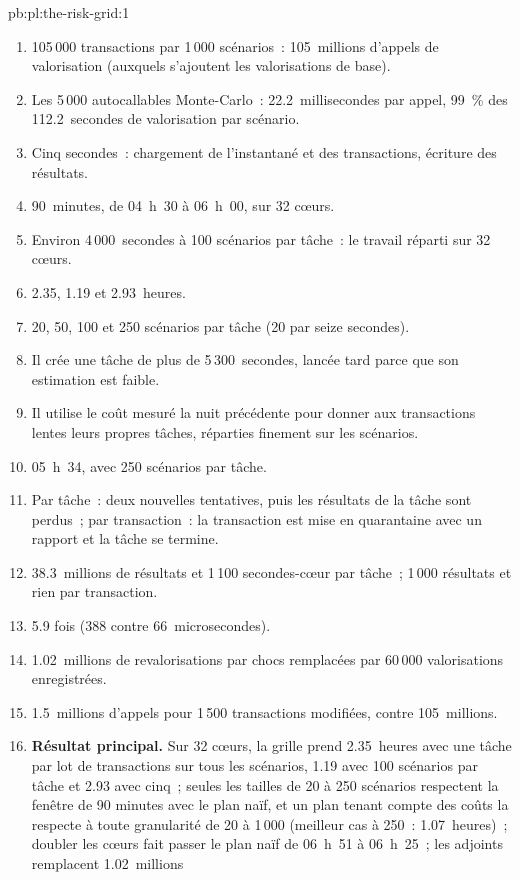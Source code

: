 \begin{solution}{pb:pl:the-risk-grid:1}
\begin{enumerate}
\item 105\,000 transactions par 1\,000 scénarios~: 105~millions d'appels de valorisation (auxquels s'ajoutent les valorisations de base).
\item Les 5\,000 autocallables Monte-Carlo~: 22.2~millisecondes par appel, 99~\% des 112.2~secondes de valorisation par scénario.
\item Cinq secondes~: chargement de l'instantané et des transactions, écriture des résultats.
\item 90~minutes, de 04~h~30 à 06~h~00, sur 32 cœurs.
\item Environ 4\,000~secondes à 100 scénarios par tâche~: le travail réparti sur 32 cœurs.
\item 2.35, 1.19 et 2.93~heures.
\item 20, 50, 100 et 250 scénarios par tâche (20 par seize secondes).
\item Il crée une tâche de plus de 5\,300~secondes, lancée tard parce que son estimation est faible.
\item Il utilise le coût mesuré la nuit précédente pour donner aux transactions lentes leurs propres tâches, réparties finement sur les scénarios.
\item 05~h~34, avec 250 scénarios par tâche.
\item Par tâche~: deux nouvelles tentatives, puis les résultats de la tâche sont perdus~; par transaction~: la transaction est mise en quarantaine avec un rapport et la tâche se termine.
\item 38.3~millions de résultats et 1\,100 secondes-cœur par tâche~; 1\,000 résultats et rien par transaction.
\item 5.9 fois (388 contre 66~microsecondes).
\item 1.02~millions de revalorisations par chocs remplacées par 60\,000 valorisations enregistrées.
\item 1.5~millions d'appels pour 1\,500 transactions modifiées, contre 105~millions.
\item \textbf{Résultat principal.} Sur 32 cœurs, la grille prend 2.35~heures avec une tâche par lot de transactions sur tous les scénarios, 1.19 avec 100 scénarios
par tâche et 2.93 avec cinq~; seules les tailles de 20 à 250 scénarios respectent la fenêtre de 90 minutes avec le plan naïf, et un plan tenant compte des coûts la respecte à toute
granularité de 20 à 1\,000 (meilleur cas à 250~: 1.07~heures)~; doubler les cœurs fait passer le plan naïf de 06~h~51 à 06~h~25~; les adjoints remplacent 1.02~millions

\end{enumerate}
\end{solution}
